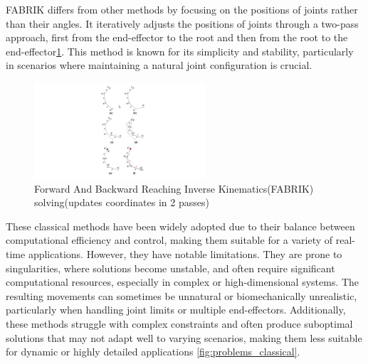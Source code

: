 \documentclass[../../main.tex]{subfiles}
\begin{document}
FABRIK differs from other methods by focusing on the positions of joints rather than their angles. It iteratively adjusts the positions of joints through a two-pass approach, first from the end-effector to the root and then from the root to the end-effector\ref{fig:fabrik}. This method is known for its simplicity and stability, particularly in scenarios where maintaining a natural joint configuration is crucial.

\begin{figure}
  \centering \includegraphics[width = 2.5in]{chapters/motion_matching/images/fabrik.png}
  \caption{Forward And Backward Reaching Inverse Kinematics(FABRIK) solving(updates coordinates in 2 passes)}
  \label{fig:fabrik}
\end{figure}

These classical methods have been widely adopted due to their balance between computational efficiency and control, making them suitable for a variety of real-time applications. However, they have notable limitations. They are prone to singularities, where solutions become unstable, and often require significant computational resources, especially in complex or high-dimensional systems. The resulting movements can sometimes be unnatural or biomechanically unrealistic, particularly when handling joint limits or multiple end-effectors. Additionally, these methods struggle with complex constraints and often produce suboptimal solutions that may not adapt well to varying scenarios, making them less suitable for dynamic or highly detailed applications \ref{fig:problems_classical}.
\end{document}
